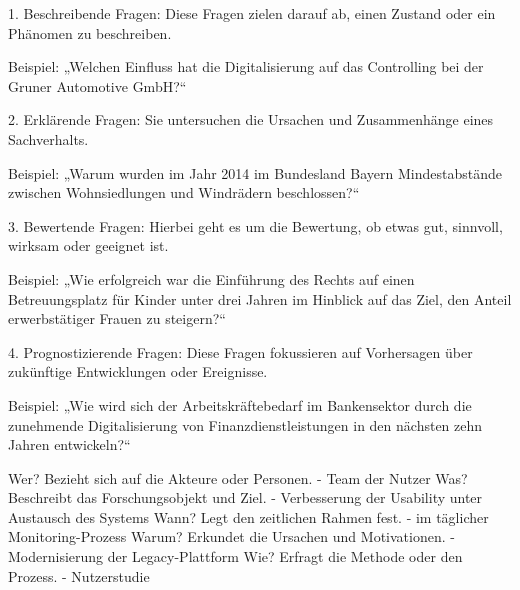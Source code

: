 1. Beschreibende Fragen:
Diese Fragen zielen darauf ab, einen Zustand oder ein Phänomen zu beschreiben. 

    Beispiel: „Welchen Einfluss hat die Digitalisierung auf das Controlling bei der Gruner Automotive GmbH?“ 

2. Erklärende Fragen:
Sie untersuchen die Ursachen und Zusammenhänge eines Sachverhalts. 

    Beispiel: „Warum wurden im Jahr 2014 im Bundesland Bayern Mindestabstände zwischen Wohnsiedlungen und Windrädern beschlossen?“ 

3. Bewertende Fragen:
Hierbei geht es um die Bewertung, ob etwas gut, sinnvoll, wirksam oder geeignet ist. 

    Beispiel: „Wie erfolgreich war die Einführung des Rechts auf einen Betreuungsplatz für Kinder unter drei Jahren im Hinblick auf das Ziel, den Anteil erwerbstätiger Frauen zu steigern?“ 

4. Prognostizierende Fragen:
Diese Fragen fokussieren auf Vorhersagen über zukünftige Entwicklungen oder Ereignisse. 

    Beispiel: „Wie wird sich der Arbeitskräftebedarf im Bankensektor durch die zunehmende Digitalisierung von Finanzdienstleistungen in den nächsten zehn Jahren entwickeln?“ 


Wer? Bezieht sich auf die Akteure oder Personen.            - Team der Nutzer
Was? Beschreibt das Forschungsobjekt und Ziel.              - Verbesserung der Usability unter Austausch des Systems
Wann? Legt den zeitlichen Rahmen fest.                      - im täglicher Monitoring-Prozess
Warum? Erkundet die Ursachen und Motivationen.              - Modernisierung der Legacy-Plattform
Wie? Erfragt die Methode oder den Prozess.                  - Nutzerstudie